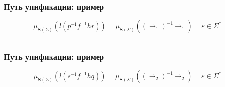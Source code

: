 \documentclass[aspectratio=169]{beamer}
\begin{document}
\begin{frame}[fragile]
  \frametitle{Путь унификации: пример}
  \vspace{-0.5cm}
  \[
    \mu_{\bm{S}(\Sigma)}(l(p^{-1}f^{-1}hr)) = \mu_{\bm{S}(\Sigma)}((\to_1)^{-1} \to_1) = \varepsilon \in \Sigma^*
  \]
  \vspace{-0.5cm}
  \begin{columns}
    \begin{column}{0.3\textwidth}
      
    \end{column}
    \begin{column}{0.7\textwidth}
      \begin{center}
        
      \end{center}
    \end{column}
    \end{columns}
\end{frame}

\begin{frame}[fragile]
  \frametitle{Путь унификации: пример}
  \vspace{-0.5cm}
  \[
    \mu_{\bm{S}(\Sigma)}(l(s^{-1}f^{-1}hq)) = \mu_{\bm{S}(\Sigma)}((\to_2)^{-1} \to_2) = \varepsilon \in \Sigma^*
  \]
  \vspace{-1cm}
  \begin{columns}
    \begin{column}{0.3\textwidth}
      
    \end{column}
    \begin{column}{0.7\textwidth}
      \begin{center}
        
      \end{center}
    \end{column}
    \end{columns}
\end{frame}
\end{document}
